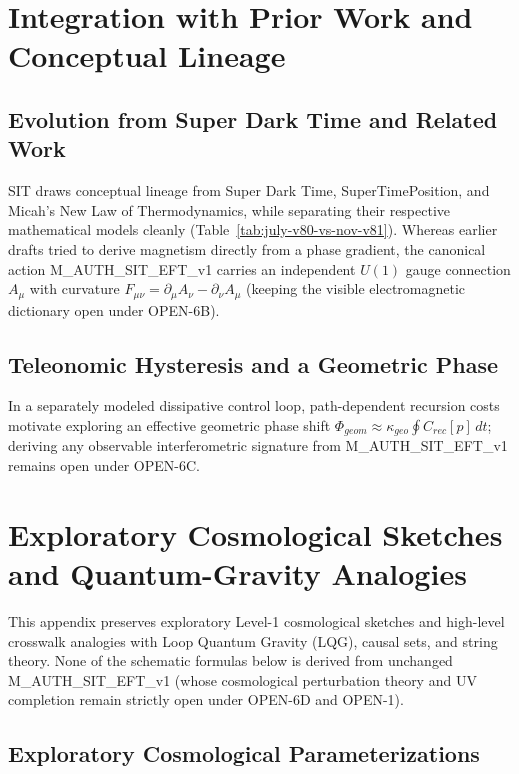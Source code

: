 \documentclass[american,11pt,letterpaper]{article}
\def\mathrm#1{#1}%
\def\texttt#1{#1}%
\def\emph#1{#1}%
\begin{document}
\section{Integration with Prior Work and Conceptual Lineage}
\label{app:prior_work}

\subsection{Evolution from \emph{Super Dark Time} and Related Work}

SIT draws conceptual lineage from \emph{Super Dark Time}, \emph{SuperTimePosition}, and Micah's New Law of Thermodynamics, while separating their respective mathematical models cleanly (Table~\ref{tab:july-v80-vs-nov-v81}). Whereas earlier drafts tried to derive magnetism directly from a phase gradient, the canonical action \texttt{M\_AUTH\_SIT\_EFT\_v1} carries an independent $U(1)$ gauge connection $A_\mu$ with curvature $F_{\mu\nu} = \partial_\mu A_\nu - \partial_\nu A_\mu$ (keeping the visible electromagnetic dictionary open under \texttt{OPEN-6B}).


\subsection*{Teleonomic Hysteresis and a Geometric Phase}
\label{sec:geom-phase}
In a separately modeled dissipative control loop, path-dependent recursion costs motivate exploring an effective geometric phase shift $\Phi_{\mathrm{geom}} \approx \kappa_{\mathrm{geo}}\oint C_{\mathrm{rec}}[p]\,dt$; deriving any observable interferometric signature from \texttt{M\_AUTH\_SIT\_EFT\_v1} remains open under \texttt{OPEN-6C}.

\section{Exploratory Cosmological Sketches and Quantum-Gravity Analogies}
\label{appendix:D}

This appendix preserves exploratory Level-1 cosmological sketches and high-level crosswalk analogies with Loop Quantum Gravity (LQG), causal sets, and string theory. None of the schematic formulas below is derived from unchanged \texttt{M\_AUTH\_SIT\_EFT\_v1} (whose cosmological perturbation theory and UV completion remain strictly open under \texttt{OPEN-6D} and \texttt{OPEN-1}).

\subsection{Exploratory Cosmological Parameterizations}
\end{document}
